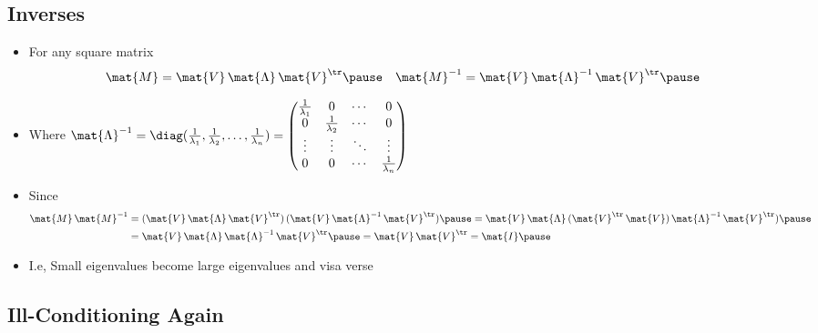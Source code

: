 \begin{slide}
\section[-2]{Inverses}

\begin{PauseHighLight}
  \begin{itemize}
  \item For any square matrix
    \begin{align*}
      \mat{M} &=\mat{V}\,\mat{\Lambda}\,\mat{V}^\tr \pause &
      \mat{M}^{-1} &=\mat{V}\,\mat{\Lambda}^{-1}\,\mat{V}^\tr \pause 
    \end{align*}
  \item Where $\mat{\Lambda}^{-1} = \diag(\tfrac{1}{\lambda_1},
    \tfrac{1}{\lambda_2}, \ldots, \tfrac{1}{\lambda_n}) =
    \begin{pmatrix}
      \tfrac{1}{\lambda_1} & 0 & \cdots & 0 \\
      0 & \tfrac{1}{\lambda_2}  & \cdots & 0 \\
      \vdots & \vdots &\ddots &\vdots \\
      0 & 0 & \cdots & \tfrac{1}{\lambda_n}
    \end{pmatrix}$\pause
  \item Since
    \begin{align*}
       \mat{M}\,\mat{M}^{-1} &= (\mat{V}\,\mat{\Lambda}\,\mat{V}^\tr)\,
       (\mat{V}\,\mat{\Lambda}^{-1}\,\mat{V}^\tr)\pause
       = \mat{V}\,\mat{\Lambda}\,(\mat{V}^\tr\,
       \mat{V})\,\mat{\Lambda}^{-1}\,\mat{V}^\tr)\pause \\
       &= \mat{V}\,\mat{\Lambda}\,\mat{\Lambda}^{-1}\,\mat{V}^\tr\pause
       = \mat{V}\,\mat{V}^\tr = \mat{I}\pause
    \end{align*}
  \item I.e, Small eigenvalues become large eigenvalues and visa verse\pause
  \end{itemize}
\end{PauseHighLight}

\end{slide}


\begin{slide}
\section[-1.5]{Ill-Conditioning Again}

\pb\pause{}
\begin{center}
  \pause
\end{center}

\end{slide}

